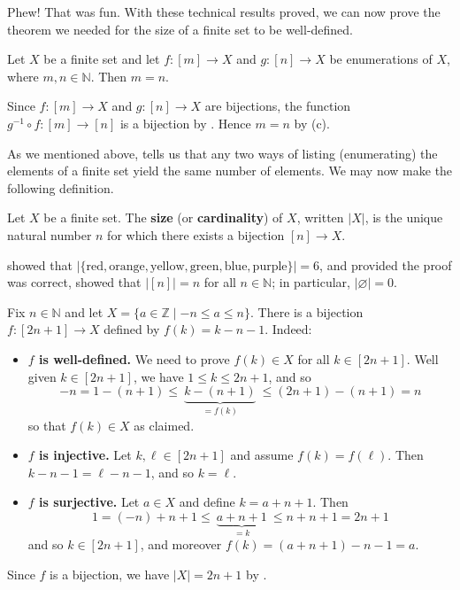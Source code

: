 Phew! That was fun. With these technical results proved, we can now prove the theorem we needed for the size of a finite set to be well-defined.

\begin{theorem}
\label{thmUniquenessOfSize}
Let $X$ be a finite set and let $f : [m] \to X$ and $g : [n] \to X$ be enumerations of $X$, where $m,n \in \mathbb{N}$. Then $m=n$.
\end{theorem}

\begin{cproof}
Since $f : [m] \to X$ and $g : [n] \to X$ are bijections, the function $g^{-1} \circ f : [m] \to [n]$ is a bijection by . Hence $m=n$ by (c).
\end{cproof}

As we mentioned above,  tells us that any two ways of listing (enumerating) the elements of a finite set yield the same number of elements. We may now make the following definition.

\begin{definition}
\label{defSize}
Let $X$ be a finite set. The \textbf{size} (or \textbf{cardinality}) of $X$, written $|X|$, is the unique natural number $n$ for which there exists a bijection $[n] \to X$.
\end{definition}

\begin{example}
 showed that $|\{ \text{red}, \text{orange}, \text{yellow}, \text{green}, \text{blue}, \text{purple} \}| = 6$, and provided the proof was correct,  showed that $|[n]| = n$ for all $n \in \mathbb{N}$; in particular, $|\varnothing| = 0$.
\end{example}

\begin{example}
\label{exBijectionFromIntegersFromMinusNToNToBracketTwoNPlusOne}
Fix $n \in \mathbb{N}$ and let $X = \{ a \in \mathbb{Z} \mid -n \le a \le n \}$. There is a bijection $f : [2n+1] \to X$ defined by $f(k) = k-n-1$. Indeed:
\begin{itemize}
\item \textbf{$f$ is well-defined.}
We need to prove $f(k) \in X$ for all $k \in [2n+1]$. Well given $k \in [2n+1]$, we have $1 \le k \le 2n+1$, and so
\[ -n = 1-(n+1) \le ~ \underbrace{k-(n+1)}_{=f(k)} ~  \le (2n+1) - (n+1) = n \]
so that $f(k) \in X$ as claimed.
\item \textbf{$f$ is injective.} Let $k, \ell \in [2n+1]$ and assume $f(k) = f(\ell)$. Then $k - n - 1 = \ell - n - 1$, and so $k = \ell$.
\item \textbf{$f$ is surjective.} Let $a \in X$ and define $k = a+n+1$. Then
\[ 1 = (-n) + n + 1 \le ~ \underbrace{a + n + 1}_{= k} ~ \le n + n + 1 = 2n+1 \]
and so $k \in [2n+1]$, and moreover $f(k) = (a+n+1)-n-1 = a$.
\end{itemize}
Since $f$ is a bijection, we have $|X| = 2n+1$ by .
\end{example}

